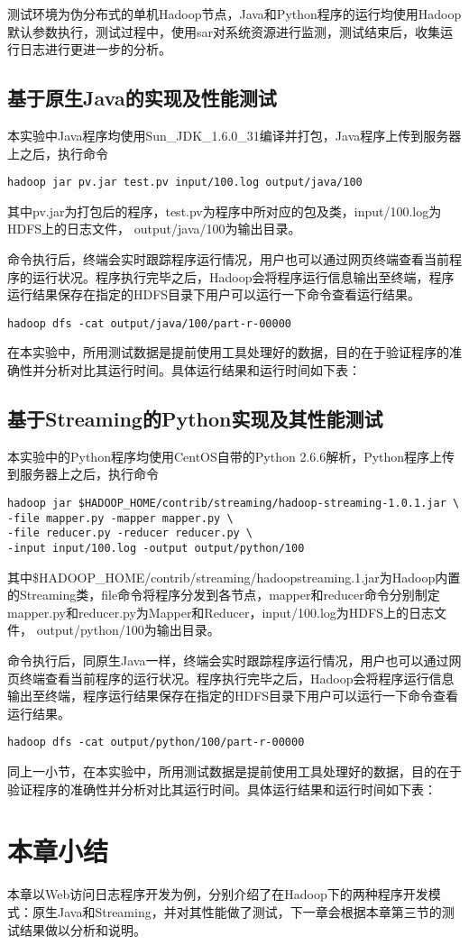 测试环境为伪分布式的单机Hadoop节点，Java和Python程序的运行均使用Hadoop默认参数执行，测试过程中，使用sar对系统资源进行监测，测试结束后，收集运行日志进行更进一步的分析。


\subsection{基于原生Java的实现及性能测试}
本实验中Java程序均使用Sun\_JDK\_1.6.0\_31编译并打包，Java程序上传到服务器上之后，执行命令

\begin{verbatim}
hadoop jar pv.jar test.pv input/100.log output/java/100
\end{verbatim}

其中pv.jar为打包后的程序，test.pv为程序中所对应的包及类，input/100.log为HDFS上的日志文件， output/java/100为输出目录。

命令执行后，终端会实时跟踪程序运行情况，用户也可以通过网页终端查看当前程序的运行状况。程序执行完毕之后，Hadoop会将程序运行信息输出至终端，程序运行结果保存在指定的HDFS目录下用户可以运行一下命令查看运行结果。

\begin{verbatim}
hadoop dfs -cat output/java/100/part-r-00000
\end{verbatim}

在本实验中，所用测试数据是提前使用工具处理好的数据，目的在于验证程序的准确性并分析对比其运行时间。具体运行结果和运行时间如下表：

\subsection{基于Streaming的Python实现及其性能测试}

本实验中的Python程序均使用CentOS自带的Python 2.6.6解析，Python程序上传到服务器上之后，执行命令

\begin{verbatim}
hadoop jar $HADOOP_HOME/contrib/streaming/hadoop-streaming-1.0.1.jar \
-file mapper.py -mapper mapper.py \
-file reducer.py -reducer reducer.py \
-input input/100.log -output output/python/100
\end{verbatim}

其中\$HADOOP\_HOME/contrib/streaming/hadoop\-streaming.1.jar为Hadoop内置的Streaming类，\-file命令将程序分发到各节点，\-mapper和\-reducer命令分别制定mapper.py和reducer.py为Mapper和Reducer，input/100.log为HDFS上的日志文件， output/python/100为输出目录。

命令执行后，同原生Java一样，终端会实时跟踪程序运行情况，用户也可以通过网页终端查看当前程序的运行状况。程序执行完毕之后，Hadoop会将程序运行信息输出至终端，程序运行结果保存在指定的HDFS目录下用户可以运行一下命令查看运行结果。

\begin{verbatim}
hadoop dfs -cat output/python/100/part-r-00000
\end{verbatim}

同上一小节，在本实验中，所用测试数据是提前使用工具处理好的数据，目的在于验证程序的准确性并分析对比其运行时间。具体运行结果和运行时间如下表：


\section{本章小结}
本章以Web访问日志程序开发为例，分别介绍了在Hadoop下的两种程序开发模式：原生Java和Streaming，并对其性能做了测试，下一章会根据本章第三节的测试结果做以分析和说明。